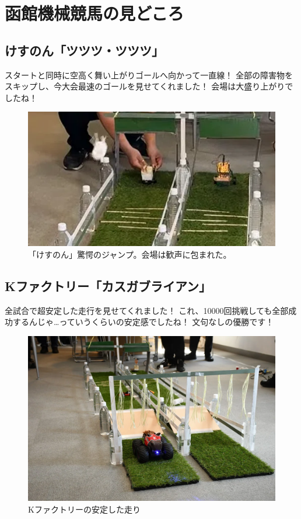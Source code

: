 \section{函館機械競馬の見どころ}
\subsection{けすのん「ツツツ・ツツツ」}
スタートと同時に空高く舞い上がりゴールへ向かって一直線！  
全部の障害物をスキップし、今大会最速のゴールを見せてくれました！  
会場は大盛り上がりでしたね！

\begin{figure}[h]
\centering
\includegraphics[width=0.7\linewidth]{pages/images/kesumon.png}
\caption{「けすのん」驚愕のジャンプ。会場は歓声に包まれた。}
\end{figure}

\subsection{Kファクトリー「カスガブライアン」}
全試合で超安定した走行を見せてくれました！  
これ、10000回挑戦しても全部成功するんじゃ…っていうくらいの安定感でしたね！  
文句なしの優勝です！

\begin{figure}[h]
\centering
\includegraphics[width=0.7\linewidth]{pages/images/kfactory.png}
\caption{Kファクトリーの安定した走り}
\end{figure}

